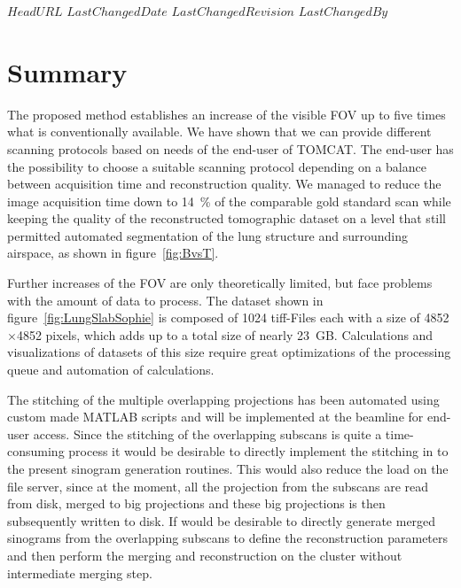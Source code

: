 \svnidlong
{$HeadURL$}
{$LastChangedDate$}
{$LastChangedRevision$}
{$LastChangedBy$}

\begin{center}
\end{center}

\section{Summary}
The proposed method establishes an increase of the visible FOV up to five times what is conventionally available. We have shown that we can provide different scanning protocols based on needs of the end-user of TOMCAT. The end-user has the possibility to choose a suitable scanning protocol depending on a balance between acquisition time and reconstruction quality. We managed to reduce the image acquisition time down to \SI{14}{\percent} of the comparable gold standard scan while keeping the quality of the reconstructed tomographic dataset on a level that still permitted automated segmentation of the lung structure and surrounding airspace, as shown in figure~\ref{fig:BvsT}.

Further increases of the FOV are only theoretically limited, but face problems with the amount of data to process. The dataset shown in figure~\ref{fig:LungSlabSophie} is composed of 1024 tiff-Files each with a size of 4852$\times$4852 pixels, which adds up to a total size of nearly \SI{23}{\giga B}. Calculations and visualizations of datasets of this size require great optimizations of the processing queue and automation of calculations.

The stitching of the multiple overlapping projections has been automated using custom made MATLAB scripts and will be implemented at the beamline for end-user access. Since the stitching of the overlapping subscans is quite a time-consuming process it would be desirable to directly implement the stitching in to the present sinogram generation routines. This would also reduce the load on the file server, since at the moment, all the projection from the subscans are read from disk, merged to big projections and these big projections is then subsequently written to disk. If would be desirable to directly generate merged sinograms from the overlapping subscans to define the reconstruction parameters and then perform the merging and reconstruction on the cluster without intermediate merging step.

